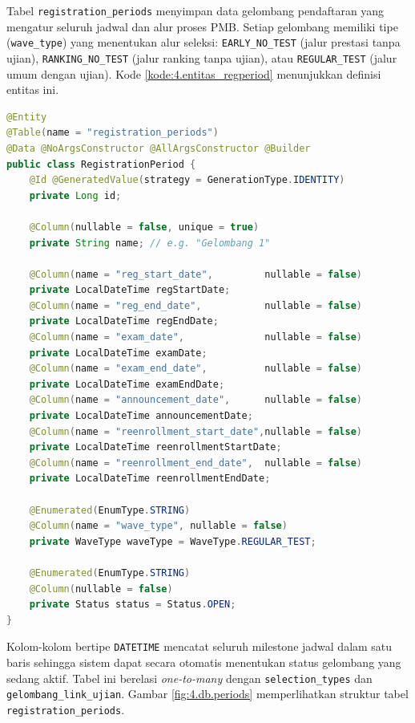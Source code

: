 Tabel \texttt{registration\_periods} menyimpan data gelombang pendaftaran yang mengatur seluruh jadwal dan alur proses PMB. Setiap gelombang memiliki tipe (\texttt{wave\_type}) yang menentukan alur seleksi: \texttt{EARLY\_NO\_TEST} (jalur prestasi tanpa ujian), \texttt{RANKING\_NO\_TEST} (jalur ranking tanpa ujian), atau \texttt{REGULAR\_TEST} (jalur umum dengan ujian). Kode \ref{kode:4.entitas_regperiod} menunjukkan definisi entitas ini.\par

\begin{lstlisting}[language=Java, caption={Entitas RegistrationPeriod yang mengatur jadwal gelombang PMB}, label={kode:4.entitas_regperiod}]
@Entity
@Table(name = "registration_periods")
@Data @NoArgsConstructor @AllArgsConstructor @Builder
public class RegistrationPeriod {
    @Id @GeneratedValue(strategy = GenerationType.IDENTITY)
    private Long id;

    @Column(nullable = false, unique = true)
    private String name; // e.g. "Gelombang 1"

    @Column(name = "reg_start_date",         nullable = false)
    private LocalDateTime regStartDate;
    @Column(name = "reg_end_date",           nullable = false)
    private LocalDateTime regEndDate;
    @Column(name = "exam_date",              nullable = false)
    private LocalDateTime examDate;
    @Column(name = "exam_end_date",          nullable = false)
    private LocalDateTime examEndDate;
    @Column(name = "announcement_date",      nullable = false)
    private LocalDateTime announcementDate;
    @Column(name = "reenrollment_start_date",nullable = false)
    private LocalDateTime reenrollmentStartDate;
    @Column(name = "reenrollment_end_date",  nullable = false)
    private LocalDateTime reenrollmentEndDate;

    @Enumerated(EnumType.STRING)
    @Column(name = "wave_type", nullable = false)
    private WaveType waveType = WaveType.REGULAR_TEST;

    @Enumerated(EnumType.STRING)
    @Column(nullable = false)
    private Status status = Status.OPEN;
}
\end{lstlisting}

Kolom-kolom bertipe \texttt{DATETIME} mencatat seluruh milestone jadwal dalam satu baris sehingga sistem dapat secara otomatis menentukan status gelombang yang sedang aktif. Tabel ini berelasi \textit{one-to-many} dengan \texttt{selection\_types} dan \texttt{gelombang\_link\_ujian}. Gambar \ref{fig:4.db.periods} memperlihatkan struktur tabel \texttt{registration\_periods}.\par

